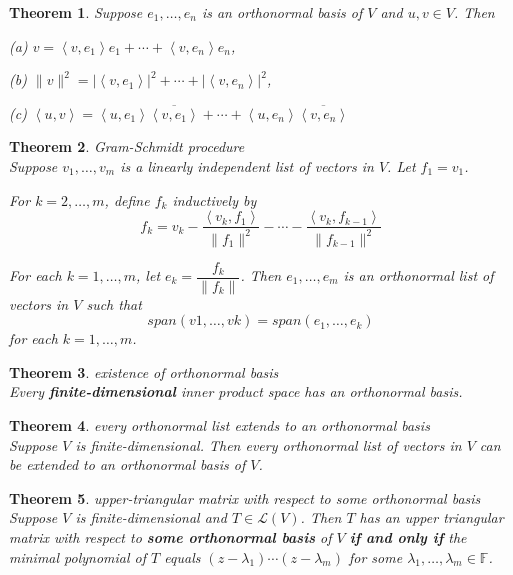 \documentclass{article}
\newtheorem{theorem}{Theorem}[subsection]
\newcommand{\FF}{\mathbb{F}}
\begin{document}
\begin{CJK}{UTF8}{gkai}
\begin{theorem}
    Suppose $e_1,\ldots,e_n$ is an orthonormal basis of $V$ and $u,v \in V$. Then

    (a) $v = \left<v,e_1\right>e_1 + \cdots+\left<v,e_n\right>e_n$,

    (b) $\|v\|^2 = |\left<v,e_1\right>|^2 + \cdots + |\left<v,e_n\right>|^2$,

    (c) $\left<u,v\right> = \left<u,e_1\right>\overline{\left<v,e_1\right>} + \cdots + \left<u,e_n\right>\overline{\left<v,e_n\right>}$
\end{theorem}

\begin{theorem}
    Gram-Schmidt procedure\\

    Suppose $v_1,\ldots,v_m$ is a linearly independent list of vectors in $V$. Let $f_1 = v_1$.

    For $k = 2,\ldots,m$, define $f_k$ inductively by
    \[f_k = v_k - \dfrac{\left<v_k, f_1\right>}{ \| f_1\|^2 } - \cdots - \dfrac{\left<v_{k}, f_{k-1}\right>}{\| f_{k - 1}\|^2}\]

    For each $k = 1,\ldots,m$, let $e_k = \dfrac{f_k}{\| f_k\|}$. Then $e_1,\ldots,e_m$ is an orthonormal list of vectors in $V$ such that
    \[span(v1,\ldots,vk) = span(e_1,\ldots,e_k)\]
    for each $k = 1,\ldots,m$.
\end{theorem}

\begin{theorem}
    existence of orthonormal basis\\

    Every \textbf{finite-dimensional} inner product space has an orthonormal basis.
\end{theorem}

\begin{theorem}
    every orthonormal list extends to an orthonormal basis\\

    Suppose $V$ is finite-dimensional. Then every orthonormal list of vectors in $V$ can be extended to an orthonormal basis of $V$.
\end{theorem}

\begin{theorem}
    upper-triangular matrix with respect to some orthonormal basis\\

    Suppose $V$ is finite-dimensional and $T \in \mathcal{L}(V)$. Then $T$ has an upper triangular matrix with respect to \textbf{some orthonormal basis} of $V$ \textbf{if and only if} the minimal polynomial of $T$ equals $(z - \lambda_1)\cdots(z - \lambda_m)$ for some $\lambda_1,\ldots, \lambda_m \in \FF$.
\end{theorem}


\end{CJK}
\end{document}
